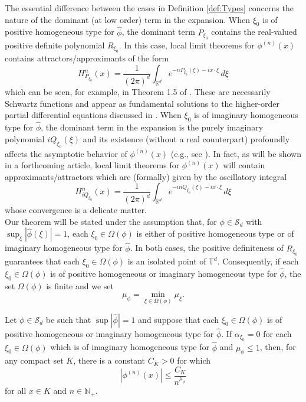 \documentclass[smallextended]{svjour3}
\theoremstyle{remark}
\begin{document}
\noindent The essential difference between the cases in Definition \ref{def:Types} 
concerns the nature of the dominant (at low order) term in the expansion. When $\xi_0$ is of positive homogeneous type for $\widehat{\phi}$, the dominant term $P_{\xi_0}$ contains the real-valued positive definite polynomial $R_{\xi_0}$. In this case, local limit theorems for $\phi^{(n)}(x)$ contains attractors/approximants of the form
\begin{equation*}
    H^n_{P_{\xi_0}}(x)=\frac{1}{(2\pi)^d}\int_{\mathbb{R}^d}e^{-nP_{\xi_0}(\xi)-ix\cdot\xi}\,d\xi
\end{equation*}
which can be seen, for example, in Theorem 1.5 of \cite{randles_convolution_2017}. These are necessarily Schwartz functions and appear as fundamental solutions to the higher-order partial differential equations discussed in \cite{randles_positive-homogeneous_2017}. When $\xi_0$ is of imaginary homogeneous type for $\widehat{\phi}$, the dominant term in the expansion is the purely imaginary polynomial $iQ_{\xi_0}(\xi)$ and its existence (without a real counterpart) profoundly affects the asymptotic behavior of $\phi^{(n)}(x)$ (e.g., see \cite{randles_convolution_2015}). In fact, as will be shown in a forthcoming article, local limit theorems for $\phi^{(n)}(x)$ will contain approximants/attractors which are (formally) given by the oscillatory integral
\begin{equation*}
    H_{iQ_{\xi_0}}^{n}(x)=\frac{1}{(2\pi)^d}\int_{\mathbb{R}^d}e^{-inQ_{\xi_0}(\xi)-ix\cdot \xi}\,d\xi
\end{equation*}
whose convergence is a delicate matter.\\






\noindent Our theorem will be stated under the assumption that, for $\phi\in\mathcal{S}_d$ with $\sup_\xi|\widehat{\phi}(\xi)|=1$, each $\xi_0\in\Omega(\phi)$ is either of positive homogeneous type or of imaginary homogeneous type for $\widehat{\phi}$. In both cases, the positive definiteness of $R_{\xi_0}$ guarantees that each $\xi_0\in\Omega(\phi)$ is an isolated point of $\mathbb{T}^d$. Consequently, if each $\xi_0\in\Omega(\phi)$ is of positive homogeneous or imaginary homogeneous type for $\widehat{\phi}$, the set $\Omega(\phi)$ is finite and we set
\begin{equation*}
    \mu_{\phi}=\min_{\xi\in\Omega(\phi)}\mu_{\xi}.
\end{equation*}

\begin{theorem}\label{thm:ConvolutionPowerEstimate}
Let $\phi\in\mathcal{S}_d$ be such that $\sup |\widehat{\phi}|=1$ and suppose that each $\xi_0\in\Omega(\phi)$ is of positive homogeneous or imaginary homogeneous type for $\widehat{\phi}$. If $\alpha_{\xi_0}=0$ for each $\xi_0\in\Omega(\phi)$ which is of imaginary homogeneous type for $\widehat{\phi}$ and $\mu_{\phi}\leq 1$, then, for any compact set $K$, there is a constant $C_K>0$ for which
\begin{equation*}
    \left|\phi^{(n)}(x)\right|\leq\frac{C_K}{n^{\mu_\phi}}
\end{equation*}
for all $x\in K$ and $n\in\mathbb{N}_+$.
\end{theorem}
\end{document}
